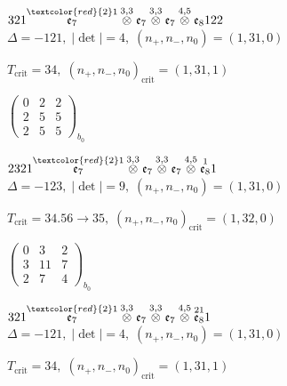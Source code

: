 \documentclass[10pt]{article}
\begin{document}
\smallskip

$321\overset{\textcolor{red}{2}1}{\mathfrak{e}_7}\overset{3,3}{\otimes}\mathfrak{e}_7\overset{3,3}{\otimes}\mathfrak{e}_7\overset{4,5}{\otimes}\mathfrak{e}_8122$ \quad $\Delta=-121,\; |\det|=4,\; (n_+,n_-,n_0)=(1,31,0)$

\hspace{1em}$T_{\text{crit}}=34,\; (n_+,n_-,n_0)_{\text{crit}}=(1,31,1)$

\hspace{2em}$\left(\begin{smallmatrix}0 & 2 & 2 \\ 2 & 5 & 5 \\ 2 & 5 & 5\end{smallmatrix}\right)_{\!b_0}$

\smallskip

$2321\overset{\textcolor{red}{2}1}{\mathfrak{e}_7}\overset{3,3}{\otimes}\mathfrak{e}_7\overset{3,3}{\otimes}\mathfrak{e}_7\overset{4,5}{\otimes}\overset{1}{\mathfrak{e}_8}1$ \quad $\Delta=-123,\; |\det|=9,\; (n_+,n_-,n_0)=(1,31,0)$

\hspace{1em}$T_{\text{crit}}=34.56 \to 35,\; (n_+,n_-,n_0)_{\text{crit}}=(1,32,0)$

\hspace{2em}$\left(\begin{smallmatrix}0 & 3 & 2 \\ 3 & 11 & 7 \\ 2 & 7 & 4\end{smallmatrix}\right)_{\!b_0}$

\smallskip

$321\overset{\textcolor{red}{2}1}{\mathfrak{e}_7}\overset{3,3}{\otimes}\mathfrak{e}_7\overset{3,3}{\otimes}\mathfrak{e}_7\overset{4,5}{\otimes}\overset{21}{\mathfrak{e}_8}1$ \quad $\Delta=-121,\; |\det|=4,\; (n_+,n_-,n_0)=(1,31,0)$

\hspace{1em}$T_{\text{crit}}=34,\; (n_+,n_-,n_0)_{\text{crit}}=(1,31,1)$
\end{document}
